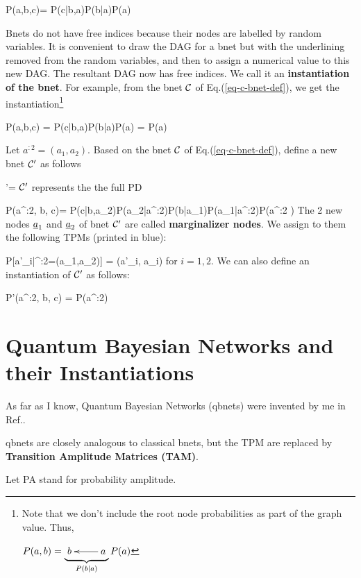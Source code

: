 \beq
P(a,b,c)=
P(c|b,a)P(b|a)P(a)
\eeq

Bnets 
do not have free
indices
because 
their nodes are labelled by random
variables. It is convenient
to draw the DAG for a 
bnet but with the
underlining
removed from the random variables,
and then to
assign a numerical value to this new DAG.
The resultant DAG now
has free indices. We call it an
{\bf instantiation of the 
bnet}.
For example, from the
bnet ${\cal C}$ 
of Eq.(\ref{eq-c-bnet-def}),
we get the
instantiation\footnote{
Note that we don't
include the root node
probabilities as part of 
the graph value. Thus,
 
$P(a,b) =
\underbrace{\xymatrix{ b&\ar[l] a}}_{P(b|a)}
P(a)$}


\beq
P(a,b,c)
=
P(c|b,a)P(b|a)P(a)
=
\bcen
{}
\ecen
P(a)
\eeq

Let $a^{:2} = (a_1, a_2)$.
Based on
the bnet ${\cal C}$ of
Eq.(\ref{eq-c-bnet-def}),
define a new bnet ${\cal C}'$
as follows

\beq
\calc'=
\bcen
{}
\ecen
\eeq
${\cal C}'$ represents the 
the full PD 

\beq
P(a^{:2}, b, c)=
P(c|b,a_2)P(a_2|a^{:2})P(b|a_1)P(a_1|a^{:2})P(a^{:2}
)
\eeq
The 2 new nodes
$\rva_1$ and $\rva_2$
of bnet ${\cal C}'$
are called 
{\bf marginalizer nodes}.
We assign to them
the following TPMs (printed in blue):

\beq \color{blue}
P[a'_i|\rva^{:2}=(a_1,a_2)] = \delta(a'_i, a_i)
\eeq
for $i=1,2$.
We can also
define an instantiation of ${\cal C}'$ as follows:

\beq
P'(a^{:2}, b, c)
=
\bcen
{}
\ecen
P(a^{:2})
\eeq




\section{Quantum Bayesian Networks and
their Instantiations}

As far as I know,
Quantum Bayesian Networks
(qbnets) were invented by me in Ref.\cite{tucci-qbnets}.

qbnets are closely
analogous to classical
bnets, but the TPM
are replaced by {\bf Transition Amplitude 
Matrices (TAM)}.

Let PA stand for probability amplitude. 

